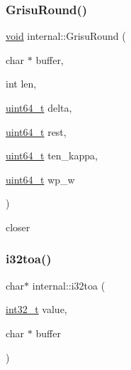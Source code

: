 \mbox{\label{namespaceinternal_a234e10bef097ccb2f202b7a133086e71}} 
\subsubsection{\texorpdfstring{Grisu\+Round()}{GrisuRound()}}
{\footnotesize\ttfamily \hyperlink{imgui__impl__opengl3__loader_8h_ac668e7cffd9e2e9cfee428b9b2f34fa7}{void} internal\+::\+Grisu\+Round (\begin{DoxyParamCaption}\item[{char $\ast$}]{buffer,  }\item[{int}]{len,  }\item[{\hyperlink{stdint_8h_aec6fcb673ff035718c238c8c9d544c47}{uint64\+\_\+t}}]{delta,  }\item[{\hyperlink{stdint_8h_aec6fcb673ff035718c238c8c9d544c47}{uint64\+\_\+t}}]{rest,  }\item[{\hyperlink{stdint_8h_aec6fcb673ff035718c238c8c9d544c47}{uint64\+\_\+t}}]{ten\+\_\+kappa,  }\item[{\hyperlink{stdint_8h_aec6fcb673ff035718c238c8c9d544c47}{uint64\+\_\+t}}]{wp\+\_\+w }\end{DoxyParamCaption})\hspace{0.3cm}{\ttfamily [inline]}}

closer \mbox{\label{namespaceinternal_a79bdea0c3f5e0c34c5c0aa686fc823c1}} 
\subsubsection{\texorpdfstring{i32toa()}{i32toa()}}
{\footnotesize\ttfamily char$\ast$ internal\+::i32toa (\begin{DoxyParamCaption}\item[{\hyperlink{stdint_8h_ab1967d8591af1a4e48c37fd2b0f184d0}{int32\+\_\+t}}]{value,  }\item[{char $\ast$}]{buffer }\end{DoxyParamCaption})\hspace{0.3cm}{\ttfamily [inline]}}

\mbox{\label{namespaceinternal_a51566359e64c9746656c396c63a23d61}} 
